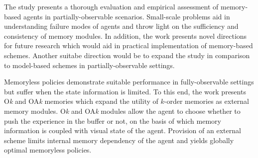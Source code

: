 \documentclass[11pt,letterpaper]{article}
\begin{document}
The study presents a thorough evaluation and empirical assessment of memory-based agents in partially-observable scenarios. Small-scale problems aid in understanding failure modes of agents and throw light on the sufficiency and consistency of memory modules. In addition, the work presents novel directions for future research which would aid in practical implementation of memory-based schemes. Another suitabe direction would be to expand the study in comparison to model-based schemes in partially-observable settings. 

Memoryless policies demonstrate suitable performance in fully-observable settings but suffer when the state information is limited. To this end, the work presents O\textit{k} and OA\textit{k} memories which expand the utility of $k$-order memories as external memory modules. O\textit{k} and OA\textit{k} modules allow the agent to choose whether to push the experience in the buffer or not, on the basis of which memory information is coupled with visual state of the agent. Provision of an external scheme limits internal memory dependency of the agent and yields globally optimal memoryless policies. 
\end{document}
